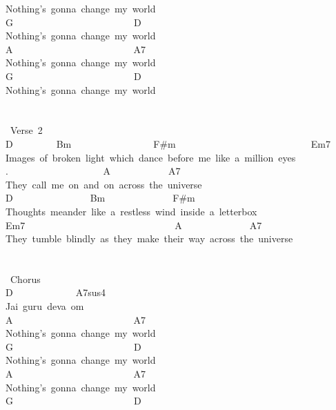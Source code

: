 {Nothing's\ gonna\ change\ my\ world\\
G\ \ \ \ \ \ \ \ \ \ \ \ \ \ \ \ \ \ \ \ \ \ \ \ \ D\\
Nothing's\ gonna\ change\ my\ world\\
A\ \ \ \ \ \ \ \ \ \ \ \ \ \ \ \ \ \ \ \ \ \ \ \ \ A7\\
Nothing's\ gonna\ change\ my\ world\\
G\ \ \ \ \ \ \ \ \ \ \ \ \ \ \ \ \ \ \ \ \ \ \ \ \ D\\
Nothing's\ gonna\ change\ my\ world\\
\\
\\
\lbrack\ Verse\ 2\rbrack\\
D\ \ \ \ \ \ \ \ \ Bm\ \ \ \ \ \ \ \ \ \ \ \ \ \ \ \ \ F\#m\ \ \ \ \ \ \ \ \ \ \ \ \ \ \ \ \ \ \ \ \ \ \ \ \ \ \ \ Em7\\
Images\ of\ broken\ light\ which\ dance\ before\ me\ like\ a\ million\ eyes\\
. \ \ \ \ \ \ \ \ \ \ \ \ \ \ \ \ \ \ \ A\ \ \ \ \ \ \ \ \ \ \ \ A7\\
They\ call\ me\ on\ and\ on\ across\ the\ universe\\
D\ \ \ \ \ \ \ \ \ \ \ \ \ \ \ \ Bm\ \ \ \ \ \ \ \ \ \ \ \ \ \ F\#m\\
Thoughts\ meander\ like\ a\ restless\ wind\ inside\ a\ letterbox\\
Em7\ \ \ \ \ \ \ \ \ \ \ \ \ \ \ \ \ \ \ \ \ \ \ \ \ \ \ \ \ \ \ A\ \ \ \ \ \ \ \ \ \ \ \ \ \ A7\\
They\ tumble\ blindly\ as\ they\ make\ their\ way\ across\ the\ universe\\
\ \ \ \ \\
\ \ \ \ \ \ \ \ \ \ \\
\lbrack\ Chorus\rbrack\\
D\ \ \ \ \ \ \ \ \ \ \ \ \ A7sus4\\
Jai\ guru\ deva\ om\\
A\ \ \ \ \ \ \ \ \ \ \ \ \ \ \ \ \ \ \ \ \ \ \ \ \ A7\\
Nothing's\ gonna\ change\ my\ world\\
G\ \ \ \ \ \ \ \ \ \ \ \ \ \ \ \ \ \ \ \ \ \ \ \ \ D\\
Nothing's\ gonna\ change\ my\ world\\
A\ \ \ \ \ \ \ \ \ \ \ \ \ \ \ \ \ \ \ \ \ \ \ \ \ A7\\
Nothing's\ gonna\ change\ my\ world\\
G\ \ \ \ \ \ \ \ \ \ \ \ \ \ \ \ \ \ \ \ \ \ \ \ \ D\\
}
